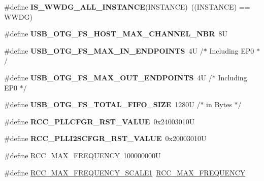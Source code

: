 \begin{DoxyCompactItemize}
\#define {\bfseries I\+S\+\_\+\+W\+W\+D\+G\+\_\+\+A\+L\+L\+\_\+\+I\+N\+S\+T\+A\+N\+CE}(I\+N\+S\+T\+A\+N\+CE)~((I\+N\+S\+T\+A\+N\+CE) == W\+W\+DG)
\item 
\mbox{\label{group___exported__macros_ga4c58971ce9062c1c7bc42e1c7ea4df32}} 
\#define {\bfseries U\+S\+B\+\_\+\+O\+T\+G\+\_\+\+F\+S\+\_\+\+H\+O\+S\+T\+\_\+\+M\+A\+X\+\_\+\+C\+H\+A\+N\+N\+E\+L\+\_\+\+N\+BR}~8U
\item 
\mbox{\label{group___exported__macros_gaccec7ca403e63ea963c363ceb7301ca6}} 
\#define {\bfseries U\+S\+B\+\_\+\+O\+T\+G\+\_\+\+F\+S\+\_\+\+M\+A\+X\+\_\+\+I\+N\+\_\+\+E\+N\+D\+P\+O\+I\+N\+TS}~4\+U    /$\ast$ Including E\+P0 $\ast$/
\item 
\mbox{\label{group___exported__macros_ga1d58ab8276cfdef9aa868bfdd2590aae}} 
\#define {\bfseries U\+S\+B\+\_\+\+O\+T\+G\+\_\+\+F\+S\+\_\+\+M\+A\+X\+\_\+\+O\+U\+T\+\_\+\+E\+N\+D\+P\+O\+I\+N\+TS}~4\+U    /$\ast$ Including E\+P0 $\ast$/
\item 
\mbox{\label{group___exported__macros_ga1e726d88af0f77cb8a49ff7b666fd990}} 
\#define {\bfseries U\+S\+B\+\_\+\+O\+T\+G\+\_\+\+F\+S\+\_\+\+T\+O\+T\+A\+L\+\_\+\+F\+I\+F\+O\+\_\+\+S\+I\+ZE}~1280\+U /$\ast$ in Bytes $\ast$/
\item 
\mbox{\label{group___exported__macros_gab0a3c8475d96f7bb0c8a6b8a7e0c943c}} 
\#define {\bfseries R\+C\+C\+\_\+\+P\+L\+L\+C\+F\+G\+R\+\_\+\+R\+S\+T\+\_\+\+V\+A\+L\+UE}~0x24003010U
\item 
\mbox{\label{group___exported__macros_gab5ca7e3fcb49274bb60c660221bbca5b}} 
\#define {\bfseries R\+C\+C\+\_\+\+P\+L\+L\+I2\+S\+C\+F\+G\+R\+\_\+\+R\+S\+T\+\_\+\+V\+A\+L\+UE}~0x20003010U
\item 
\#define \hyperlink{group___exported__macros_ga08aeea283003a2c787227347087b5b1f}{R\+C\+C\+\_\+\+M\+A\+X\+\_\+\+F\+R\+E\+Q\+U\+E\+N\+CY}~100000000U
\item 
\#define \hyperlink{group___exported__macros_ga152c4bb0b78589a06d72e0170dd3b304}{R\+C\+C\+\_\+\+M\+A\+X\+\_\+\+F\+R\+E\+Q\+U\+E\+N\+C\+Y\+\_\+\+S\+C\+A\+L\+E1}~\hyperlink{group___exported__macros_ga08aeea283003a2c787227347087b5b1f}{R\+C\+C\+\_\+\+M\+A\+X\+\_\+\+F\+R\+E\+Q\+U\+E\+N\+CY}

\end{DoxyCompactItemize}
